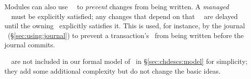 Modules can also use \noop\ \chdescs\ to \emph{prevent} changes from being
written. A \emph{managed} \noop\ \chdesc\ must be explicitly satisfied; any
changes that depend on that \noop\ \chdesc\ are delayed until the owning \module\
explicitly satisfies it. This is used, for instance, by the journal \module\
(\S\ref{sec:using:journal}) to prevent a transaction's \chdescs\ from
being written before the journal commits.

\Noop\ \chdescs\ are not included in our formal model of \chdescs\ in
\S\ref{sec:chdescs:model} for simplicity; they add some additional complexity
but do not change the basic ideas.
